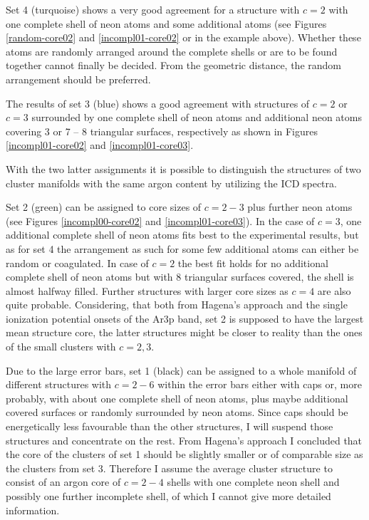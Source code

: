 Set 4 (turquoise) shows a very good agreement for a structure with $c=2$ with one
complete shell of neon atoms and some additional atoms (see Figures
\ref{random-core02} and \ref{incompl01-core02} or in the example above).
Whether these atoms are
randomly arranged around the complete shells or are to be found together cannot
finally be decided. From the geometric distance, the random arrangement should
be preferred.

The results of set 3 (blue) shows a good agreement with structures
of $c=2$ or $c=3$ surrounded by one complete shell of neon atoms and additional
neon atoms covering 3 or 7 -- 8 triangular surfaces, respectively 
as shown in Figures \ref{incompl01-core02} and \ref{incompl01-core03}. 

With the two latter assignments it is possible to distinguish
the structures of two cluster manifolds with the same argon content by utilizing the
ICD spectra.

Set 2 (green) can be assigned to core sizes of $c=2-3$ plus further neon atoms
(see Figures \ref{incompl00-core02} and \ref{incompl01-core03}).
In the case of $c=3$, one additional complete shell of neon atoms fits
best to the experimental results, but as for set 4 the arrangement as such for
some few additional atoms can either be random or coagulated.
In case of $c=2$ the best fit holds for no additional complete shell of
neon atoms but with 8 triangular surfaces covered, the shell is almost halfway filled.
Further structures with larger core sizes as $c=4$
are also quite probable. Considering, that 
both from Hagena's approach and the single ionization potential
onsets of the Ar3p band, set 2 is supposed to have the largest mean structure
core, the latter structures might be closer to reality than the ones of the small clusters
with $c=2,3$.

Due to the large error bars, set 1 (black) can be assigned to a whole manifold
of different structures with $c = 2 - 6$ within the error bars
either with caps or, more probably,
with about one complete shell of neon atoms, plus maybe additional covered surfaces
or randomly surrounded by neon atoms. Since caps should be energetically less
favourable than the other structures, I will suspend those structures
and concentrate
on the rest.
From Hagena's approach I concluded that the core of the clusters of set 1
should be slightly
smaller or of comparable size as the clusters from set 3. Therefore I assume
the average cluster structure to consist of an argon core of $c=2-4$ shells
with one complete neon shell and possibly one further incomplete shell, of
which I cannot give more detailed information.


